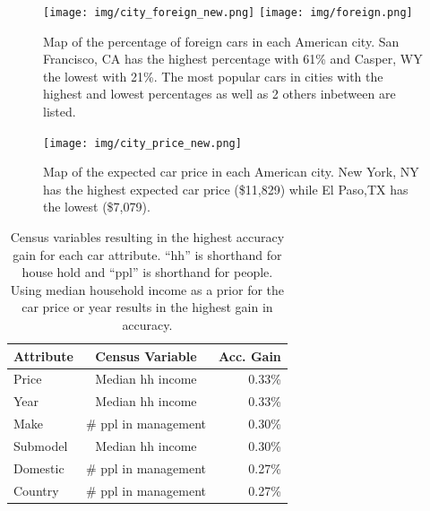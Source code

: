 \documentclass[10pt,twocolumn,letterpaper]{article}
\begin{document}
\begin{figure}[t]
\begin{center}
    \texttt{[image: img/city\_foreign\_new.png]}
    \texttt{[image: img/foreign.png]}
\end{center}
   \caption {Map of the percentage of foreign cars in each American city. San Francisco, CA has the highest percentage with 61\% and Casper, WY the lowest with 21\%. The most popular cars in cities with the highest and lowest percentages as well as 2 others inbetween are listed.} 
\label{fig:city_price}
\end{figure}

\begin{figure}[t]
\begin{center}
    \texttt{[image: img/city\_price\_new.png]}
\end{center}
   \caption {Map of the expected car price in each American city. New York, NY has the highest expected car price (\$11,829) while El Paso,TX has the lowest (\$7,079).}
\label{fig:city_price}
\end{figure}

\begin{table}
\begin{center}
\begin{tabular}{|l|c|r|}
\hline
\textbf{Attribute} & \textbf{Census Variable}& \textbf{Acc. Gain}\\
\hline\hline
Price & Median hh income & 0.33\%\\
Year  & Median hh income & 0.33\%\\
Make & \#  ppl in management & 0.30\%\\
Submodel & Median hh income & 0.30\%\\
Domestic & \# ppl in management & 0.27\%\\
Country & \# ppl in management & 0.27\%\\
\hline
\end{tabular}
\end{center}
\caption{Census variables resulting in the highest accuracy gain for each car attribute. ``hh'' is shorthand for house hold and ``ppl'' is shorthand for people. Using median household income as a prior for the car price or year results in the highest gain in accuracy.}
\label{table:prior-acc}
\end{table}
\end{document}
